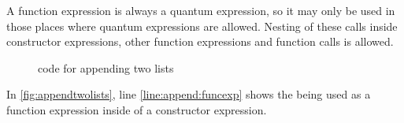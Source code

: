 A function expression is always a quantum expression, so it may only be
used in those places where quantum expressions are allowed. Nesting of
these calls inside constructor expressions, other function expressions
and function calls is allowed.

\begin{figure}[htbp]

\caption{\lqpl{} code for appending two lists}\label{fig:appendtwolists}
\end{figure}

In \vref{fig:appendtwolists}, line \ref{line:append:funcexp} shows the
 being used as a function expression inside of a
constructor expression.
